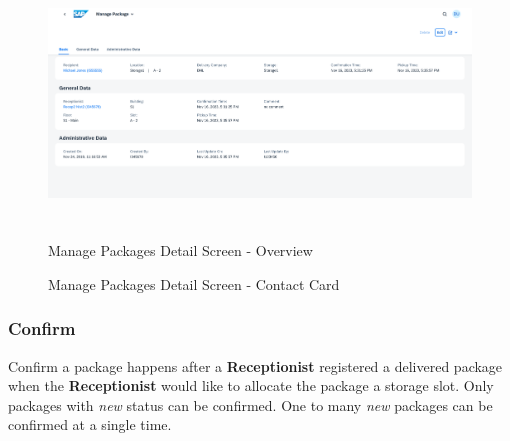 \begin{figure}[H]
	\centering
	\includegraphics[height=200pt]{images/user_doc/managePack/DetailScreen/browse/overview.png}
	\caption{Manage Packages Detail Screen - Overview}
	\label{fig:MPReportCOntactCard}
\end{figure}

\begin{figure}[H]
	\centering
	\hspace{5pt}
    \caption{Manage Packages Detail Screen - Contact Card}
	\label{fig:MPObjectContactCard}
\end{figure}

\subsubsection{Confirm}

Confirm a package happens after a \textbf{Receptionist} registered a delivered package when the \textbf{Receptionist} would like to allocate the package a storage slot. Only packages with \textit{new} status can be confirmed. One to many \textit{new} packages can be confirmed at a single time.

